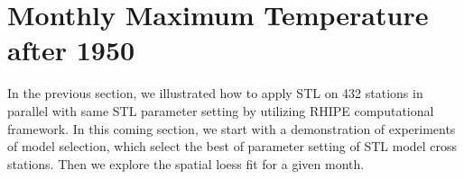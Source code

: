 

%




\section{Monthly Maximum Temperature after 1950}

In the previous section, we illustrated how to apply STL on 432 stations in parallel
with same STL parameter setting by utilizing RHIPE computational framework. In 
this coming section, we start with a demonstration of experiments of model selection,
which select the best of parameter setting of STL model cross stations. Then we
explore the spatial loess fit for a given month. 

